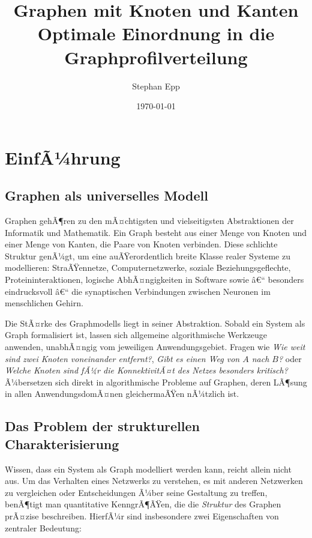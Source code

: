 ﻿\documentclass[a4paper,12pt]{article}
\title{Graphen mit Knoten und Kanten \\[0.5ex]\large Optimale Einordnung in die Graphprofilverteilung}
\author{Stephan Epp}
\date{\today}
\theoremstyle{definition}
\begin{document}
	
	\maketitle
	
	\tableofcontents
	\newpage
	
	\section{EinfÃ¼hrung}

	\subsection{Graphen als universelles Modell}

	Graphen gehÃ¶ren zu den mÃ¤chtigsten und vielseitigsten Abstraktionen der Informatik und Mathematik. Ein Graph besteht aus einer Menge von Knoten und einer Menge von Kanten, die Paare von Knoten verbinden. Diese schlichte Struktur genÃ¼gt, um eine auÃŸerordentlich breite Klasse realer Systeme zu modellieren: StraÃŸennetze, Computernetzwerke, soziale Beziehungsgeflechte, Proteininteraktionen, logische AbhÃ¤ngigkeiten in Software sowie â€“ besonders eindrucksvoll â€“ die synaptischen Verbindungen zwischen Neuronen im menschlichen Gehirn.

	Die StÃ¤rke des Graphmodells liegt in seiner Abstraktion. Sobald ein System als Graph formalisiert ist, lassen sich allgemeine algorithmische Werkzeuge anwenden, unabhÃ¤ngig vom jeweiligen Anwendungsgebiet. Fragen wie \emph{Wie weit sind zwei Knoten voneinander entfernt?}, \emph{Gibt es einen Weg von $A$ nach $B$?} oder \emph{Welche Knoten sind fÃ¼r die KonnektivitÃ¤t des Netzes besonders kritisch?} Ã¼bersetzen sich direkt in algorithmische Probleme auf Graphen, deren LÃ¶sung in allen AnwendungsdomÃ¤nen gleichermaÃŸen nÃ¼tzlich ist.

	\subsection{Das Problem der strukturellen Charakterisierung}

	Wissen, dass ein System als Graph modelliert werden kann, reicht allein nicht aus. Um das Verhalten eines Netzwerks zu verstehen, es mit anderen Netzwerken zu vergleichen oder Entscheidungen Ã¼ber seine Gestaltung zu treffen, benÃ¶tigt man quantitative KenngrÃ¶ÃŸen, die die \emph{Struktur} des Graphen prÃ¤zise beschreiben. HierfÃ¼r sind insbesondere zwei Eigenschaften von zentraler Bedeutung:
\end{document}
